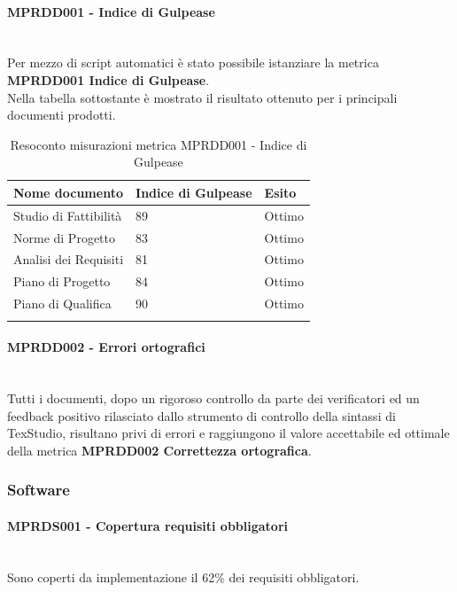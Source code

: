 \paragraph{MPRDD001 - Indice di Gulpease}\mbox{}\\[0.4cm]
Per mezzo di script automatici è stato possibile istanziare la metrica  \textbf{MPRDD001 Indice di Gulpease}.\\
Nella tabella sottostante è mostrato il risultato ottenuto per i principali documenti prodotti.
\begin{center}%
	\centering
	\renewcommand{\arraystretch}{1.5}
	\begin{longtable}{  p{5cm}  p{5cm} p{3cm}  }
		\rowcolor{tableHeadYellow}
		\textbf{Nome documento}   & \textbf{Indice di \mbox{Gulpease}} & \textbf{Esito} \\ 
		\endhead
		Studio di Fattibilità     & 89                                 & Ottimo \\
		Norme di Progetto         & 83                                 & Ottimo \\
		Analisi dei Requisiti     & 81                                 & Ottimo \\
		Piano di Progetto         & 84                                & Ottimo \\
		Piano di Qualifica        & 90                                 & Ottimo \\
		\rowcolor{white}
		\caption{Resoconto misurazioni metrica MPRDD001 - Indice di Gulpease}
	\end{longtable}
\end{center}
\paragraph{MPRDD002 - Errori ortografici}\mbox{}\\[0.4cm]
Tutti i documenti, dopo un rigoroso controllo da parte dei verificatori ed un feedback positivo rilasciato dallo strumento di controllo della sintassi di TexStudio, risultano privi di errori e raggiungono il valore accettabile ed ottimale della metrica  \textbf{MPRDD002 Correttezza ortografica}.
\clearpage
\subsubsection{Software}
\paragraph{MPRDS001 - Copertura requisiti obbligatori}\mbox{}\\[0.4cm]
Sono coperti da implementazione il 62\% dei requisiti obbligatori.
